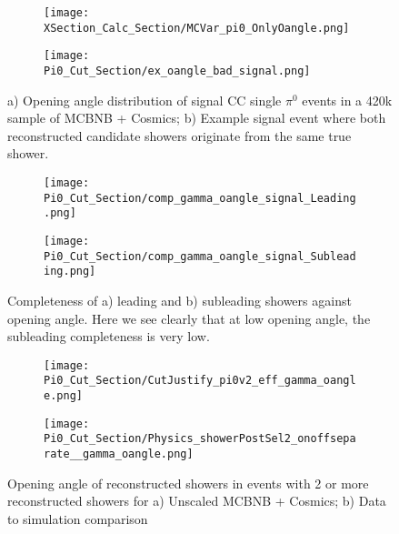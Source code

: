 \documentclass{article}
\begin{document}
\begin{figure}[H]
\centering
  \begin{subfigure}[t]{0.35\textwidth}
    \centering
     \texttt{[image: XSection\_Calc\_Section/MCVar\_pi0\_OnlyOangle.png]}
     \caption{ }
  \end{subfigure} 
  \begin{subfigure}[t]{0.6\textwidth}
    \centering
    \texttt{[image: Pi0\_Cut\_Section/ex\_oangle\_bad\_signal.png]}
    \caption{ }
  \end{subfigure} 
  \caption{ a) Opening angle distribution of signal CC single $\pi^0$ events in a 420k sample of MCBNB + Cosmics; b) Example signal event where both reconstructed candidate showers originate from the same true shower. }
\label{fig:mcvar_pi0_onlyoangle}
\end{figure}

\begin{figure}[H]
\centering
  \begin{subfigure}[t]{0.35\textwidth}
    \centering
\texttt{[image: Pi0\_Cut\_Section/comp\_gamma\_oangle\_signal\_Leading.png]}
  \caption{ }
  \end{subfigure} 
  \hspace{20mm}
  \begin{subfigure}[t]{0.35\textwidth}
    \centering
    \texttt{[image: Pi0\_Cut\_Section/comp\_gamma\_oangle\_signal\_Subleading.png]}
  \caption{ }
  \end{subfigure} 
\caption{ Completeness of a) leading and b) subleading showers against opening angle. Here we see clearly that at low opening angle, the subleading completeness is very low. }
\label{fig:cutjust_pi0_OA}
\end{figure}

\begin{figure}[H]
\centering
  \begin{subfigure}[t]{0.35\textwidth}
    \centering
\texttt{[image: Pi0\_Cut\_Section/CutJustify\_pi0v2\_eff\_gamma\_oangle.png]}
  \caption{ }
  \end{subfigure} 
  \hspace{20mm}
  \begin{subfigure}[t]{0.35\textwidth}
    \centering
    \texttt{[image: Pi0\_Cut\_Section/Physics\_showerPostSel2\_onoffseparate\_\_gamma\_oangle.png]}
  \caption{ }
  \end{subfigure} 
\caption{ Opening angle of reconstructed showers in events with 2 or more reconstructed showers for a) Unscaled MCBNB + Cosmics; b) Data to simulation comparison }
\label{fig:cutjust_pi0_OA}
\end{figure}
\end{document}
